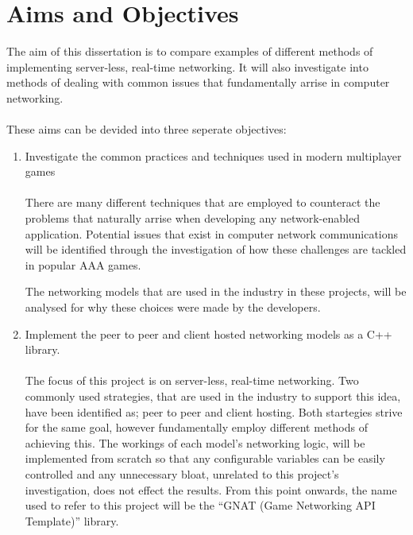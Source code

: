 \section{Aims and Objectives}\label{sec:aims_and_objectives}
The aim of this dissertation is to compare examples of different methods of implementing server-less, real-time networking. It will also investigate into methods of dealing with common issues that fundamentally arrise in computer networking.
\\\\
These aims can be devided into three seperate objectives:
\begin{enumerate}
\item Investigate the common practices and techniques used in modern multiplayer games
  \\\\
  There are many different techniques that are employed to counteract the problems that naturally arrise when developing any network-enabled application. Potential issues that exist in computer network communications will be identified through the investigation of how these challenges are tackled in popular AAA games.

  The networking models that are used in the industry in these projects, will be analysed for why these choices were made by the developers.


\item Implement the peer to peer and client hosted networking models as a C++ library.
  \\\\
  The focus of this project is on server-less, real-time networking. Two commonly used strategies, that are used in the industry to support this idea, have been identified as; peer to peer and client hosting. Both startegies strive for the same goal, however fundamentally employ different methods of achieving this.
  The workings of each model's networking logic, will be implemented from scratch so that any configurable variables can be easily controlled and any unnecessary bloat, unrelated to this project's investigation, does not effect the results.
  From this point onwards, the name used to refer to this project will be the ``GNAT (Game Networking API Template)'' library.


\end{enumerate}
